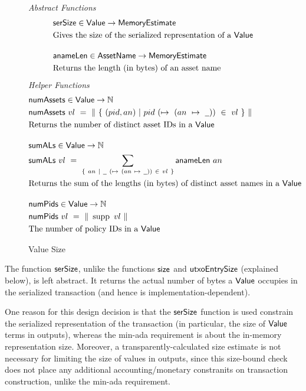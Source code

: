 \begin{figure*}[h]
  \emph{Abstract Functions}
  \begin{align*}
    & \fun{serSize} \in \Value \to \MemoryEstimate \\
    & \text{Gives the size of the serialized representation of a $\Value$}
    \nextdef
    & \fun{anameLen} \in \AssetName \to \MemoryEstimate \\
    & \text{Returns the length (in bytes) of an asset name}
  \end{align*}
  \emph{Helper Functions}
  \begin{align*}
    & \fun{numAssets} \in \Value \to \N \\
    & \fun{numAssets}~{vl}~=~\|~\{~(pid, an)~\vert~pid~(\mapsto~(an~\mapsto~\wcard))~\in~vl~\}~\| \\
    & \text{Returns the number of distinct asset IDs in a $\Value$}
    & \nextdef
    & \fun{sumALs} \in \Value \to \N \\
    & \fun{sumALs}~{vl}~=~ \sum_{\{~an~\vert~\wcard~(\mapsto~(an~\mapsto~\wcard))~\in~vl~\}} \fun{anameLen}~an \\
    & \text{Returns the sum of the lengths (in bytes) of distinct asset names in a $\Value$}
    & \nextdef
    & \fun{numPids} \in \Value \to \N \\
    & \fun{numPids}~{vl} ~=~ \|~\supp~{vl}~\| \\
    & \text{The number of policy IDs in a $\Value$}
  \end{align*}
  \caption{Value Size}
  \label{fig:size-helper}
\end{figure*}

The function $\mathsf{serSize}$, unlike the functions $\mathsf{size}$ and $\mathsf{utxoEntrySize}$
    (explained below), is left abstract. It returns the actual number of bytes a $\mathsf{Value}$
    occupies in the serialized transaction (and hence is implementation-dependent).

    One reason for this design decision is that the $\mathsf{serSize}$ function is used constrain
    the serialized representation of the transaction (in particular, the size
    of $\mathsf{Value}$ terms in outputs), whereas the min-ada requirement is about
    the in-memory representation size. Moreover, a transparently-calculated size estimate
    is not necessary for limiting the size of values in outputs, since this size-bound
    check does not place any additional accounting/monetary constranits on transaction construction,
    unlike the min-ada requirement.

